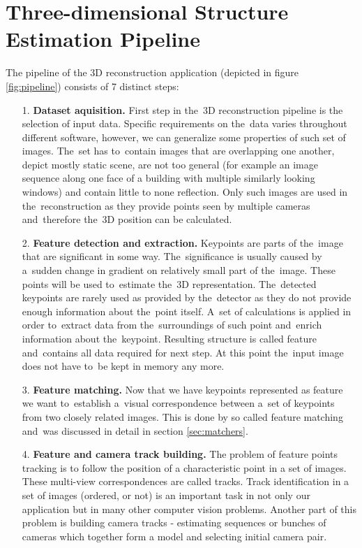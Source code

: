 \section{Three-dimensional Structure Estimation Pipeline}
\label{sec:pipeline}
The pipeline of the 3D reconstruction application (depicted in figure \ref{fig:pipeline}) consists of 7 distinct steps:
\begin{itemize}
	\item[1.] \textbf{Dataset aquisition.} First step in the~3D reconstruction pipeline is the selection of input data. Specific requirements on the~data varies throughout different software, however, we can generalize some properties of such set of images. The~set has to~contain images that are overlapping one another, depict mostly static scene, are not too general (for example an image sequence along one face of a building with multiple similarly looking windows) and contain little to none reflection. Only such images are used in the~reconstruction as they provide points seen by multiple cameras and~therefore the~3D position can be calculated.
	\item[2.] \textbf{Feature detection and extraction.} Keypoints are parts of the~image that are significant in some way. The~significance is usually caused by a~sudden change in gradient on relatively small part of the~image. These points will be used to~estimate the~3D representation. The~detected keypoints are rarely used as provided by the~detector as they do not provide enough information about the~point itself. A~set of calculations is applied in order to~extract data from the~surroundings of such point and~enrich information about the~keypoint. Resulting structure is called feature and~contains all data required for next step. At this point the~input image does not have to~be kept in memory any more.
	\item[3.] \textbf{Feature matching.} Now that we have keypoints represented as feature we want to~establish a~visual correspondence between a~set of keypoints from two closely related images. This is done by so called feature matching and~was discussed in detail in section \ref{sec:matchers}.
	\item[4.] \textbf{Feature and camera track building.} The problem of feature points tracking is to follow the position of a characteristic point in a set of images. These multi-view correspondences are called tracks. Track identification in a set of images (ordered, or not) is an important task in not only our application but in many other computer vision problems. Another part of this problem is building camera tracks - estimating sequences or bunches of cameras which together form a model and selecting initial camera pair.

\end{itemize}
